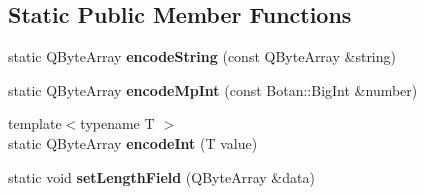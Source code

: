 \subsection*{Static Public Member Functions}
\begin{DoxyCompactItemize}
\item 
\mbox{\label{class_q_ssh_1_1_internal_1_1_abstract_ssh_packet_aaefc211894bf8da89bd6b261fc56351e}} 
static Q\+Byte\+Array {\bfseries encode\+String} (const Q\+Byte\+Array \&string)
\item 
\mbox{\label{class_q_ssh_1_1_internal_1_1_abstract_ssh_packet_a2f33042253511f3adfb033cf7c11ef65}} 
static Q\+Byte\+Array {\bfseries encode\+Mp\+Int} (const Botan\+::\+Big\+Int \&number)
\item 
\mbox{\label{class_q_ssh_1_1_internal_1_1_abstract_ssh_packet_aee949d9c4d9b5448f97d850ac930b689}} 
{\footnotesize template$<$typename T $>$ }\\static Q\+Byte\+Array {\bfseries encode\+Int} (T value)
\item 
\mbox{\label{class_q_ssh_1_1_internal_1_1_abstract_ssh_packet_a7acf02ddb60eb38b2ae64a9dd80aff1b}} 
static void {\bfseries set\+Length\+Field} (Q\+Byte\+Array \&data)
\end{DoxyCompactItemize}
